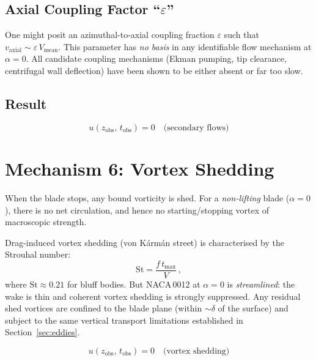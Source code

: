 \documentclass[11pt,a4paper]{article}
\begin{document}
\subsection{Axial Coupling Factor ``$\varepsilon$''}

One might posit an azimuthal-to-axial coupling fraction
$\varepsilon$ such that $v_\mathrm{axial} \sim \varepsilon\,
V_\mathrm{mean}$. This parameter has \emph{no basis} in any
identifiable flow mechanism at $\alpha = 0$. All candidate coupling
mechanisms (Ekman pumping, tip clearance, centrifugal wall deflection)
have been shown to be either absent or far too slow.

\subsection{Result}

\begin{equation}
  \boxed{u(z_\mathrm{obs},\, t_\mathrm{obs})
    = 0 \quad \text{(secondary flows)}}
\end{equation}


\section{Mechanism 6: Vortex Shedding}
\label{sec:vortex}

When the blade stops, any bound vorticity is shed. For a
\emph{non-lifting} blade ($\alpha = 0$), there is no net circulation,
and hence no starting/stopping vortex of macroscopic strength.

Drag-induced vortex shedding (von K\'arm\'an street) is characterised by
the Strouhal number:
\begin{equation}
  \mathrm{St} = \frac{f\, t_\mathrm{max}}{V}\,,
\end{equation}
where $\mathrm{St} \approx 0.21$ for bluff bodies. But NACA\,0012 at
$\alpha = 0$ is \emph{streamlined}: the wake is thin and coherent
vortex shedding is strongly suppressed. Any residual shed vortices are
confined to the blade plane (within $\sim\delta$ of the surface) and
subject to the same vertical transport limitations established in
Section~\ref{sec:eddies}.

\begin{equation}
  \boxed{u(z_\mathrm{obs},\, t_\mathrm{obs})
    = 0 \quad \text{(vortex shedding)}}
\end{equation}
\end{document}
